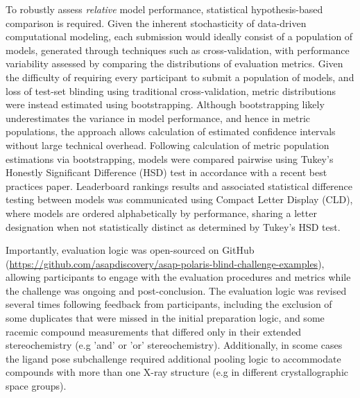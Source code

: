 \documentclass[journal=jcim,manuscript=article]{achemso}
\begin{document}
{To robustly assess \textit{relative} model performance, statistical hypothesis-based comparison is required\cite{ash_practically_2024}. Given the inherent stochasticity of data-driven computational modeling, each submission would ideally consist of a population of models, generated through techniques such as cross-validation, with performance variability assessed by comparing the distributions of evaluation metrics. Given the difficulty of requiring every participant to submit a population of models, and loss of test-set blinding using traditional cross-validation, metric distributions were instead estimated using bootstrapping\cite{efron_bootstrap_1979}. Although bootstrapping likely underestimates the variance in model performance, and hence in metric populations, the approach allows calculation of estimated confidence intervals without large technical overhead. Following calculation of metric population estimations via bootstrapping, models were compared pairwise using Tukey's Honestly Significant Difference (HSD) test in accordance with a recent best practices paper\cite{ash_practically_2024}. Leaderboard rankings results and associated statistical difference testing between models was communicated using Compact Letter Display (CLD)\cite{cld_algorithm_2004}, where models are ordered alphabetically by performance, sharing a letter designation when not statistically distinct as determined by Tukey's HSD test. 

Importantly, evaluation logic was open-sourced on GitHub (\url{https://github.com/asapdiscovery/asap-polaris-blind-challenge-examples}), allowing participants to engage with the evaluation procedures and metrics while the challenge was ongoing and post-conclusion. The evaluation logic was revised several times following feedback from participants, including the exclusion of some duplicates that were missed in the initial preparation logic, and some racemic compound measurements that differed only in their extended stereochemistry (e.g 'and' or 'or' stereochemistry). Additionally, in scome cases the ligand pose subchallenge required additional pooling logic to accommodate compounds with more than one X-ray structure (e.g in different crystallographic space groups). 

}
\end{document}
